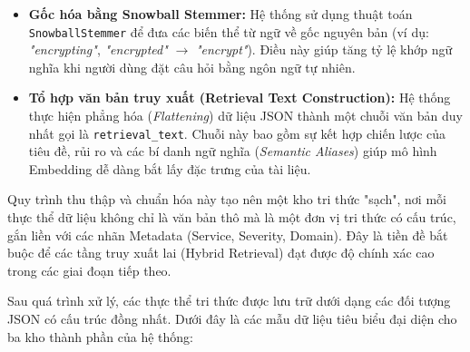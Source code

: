 \begin{enumerate}
\begin{itemize}
        \item \textbf{Gốc hóa bằng Snowball Stemmer:} Hệ thống sử dụng thuật toán \texttt{SnowballStemmer} để đưa các biến thể từ ngữ về gốc nguyên bản (ví dụ: \textit{"encrypting"}, \textit{"encrypted"} $\rightarrow$ \textit{"encrypt"}). Điều này giúp tăng tỷ lệ khớp ngữ nghĩa khi người dùng đặt câu hỏi bằng ngôn ngữ tự nhiên.

        \item \textbf{Tổ hợp văn bản truy xuất (Retrieval Text Construction):} Hệ thống thực hiện phẳng hóa (\textit{Flattening}) dữ liệu JSON thành một chuỗi văn bản duy nhất gọi là \texttt{retrieval\_text}. Chuỗi này bao gồm sự kết hợp chiến lược của tiêu đề, rủi ro và các bí danh ngữ nghĩa (\textit{Semantic Aliases}) giúp mô hình Embedding dễ dàng bắt lấy đặc trưng của tài liệu.
    \end{itemize}
\end{enumerate}

Quy trình thu thập và chuẩn hóa này tạo nên một kho tri thức "sạch", nơi mỗi thực thể dữ liệu không chỉ là văn bản thô mà là một đơn vị tri thức có cấu trúc, gắn liền với các nhãn Metadata (Service, Severity, Domain). Đây là tiền đề bắt buộc để các tầng truy xuất lai (Hybrid Retrieval) đạt được độ chính xác cao trong các giai đoạn tiếp theo.


Sau quá trình xử lý, các thực thể tri thức được lưu trữ dưới dạng các đối tượng JSON có cấu trúc đồng nhất. Dưới đây là các mẫu dữ liệu tiêu biểu đại diện cho ba kho thành phần của hệ thống:

